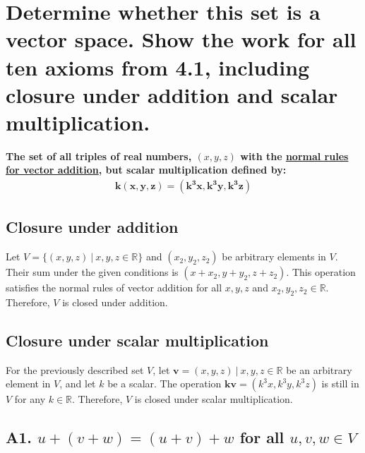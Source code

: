 \documentclass[
  letterpaper,
  DIV=11,
  numbers=noendperiod]{scrartcl}
\author{}
\date{}
\renewcommand*\contentsname{Table of contents}
\newcommand\contentsname{Table of contents}
\begin{document}

\newpage

\renewcommand*\contentsname{Table of Contents}
{
\hypersetup{linkcolor=}
\setcounter{tocdepth}{4}
\tableofcontents
}
\newpage{}

\section{Determine whether this set is a vector space. Show the work for
all ten axioms from 4.1, including closure under addition and scalar
multiplication.}\label{determine-whether-this-set-is-a-vector-space.-show-the-work-for-all-ten-axioms-from-4.1-including-closure-under-addition-and-scalar-multiplication.}

\textbf{The set of all triples of real numbers, \((x, y, z)\) with the
\ul{normal rules for vector addition}, but scalar multiplication defined
by:} \begin{align*}
\mathbf{k(x, y, z) = (k^3x, k^3y, k^3z)}
\end{align*}

\subsection{Closure under addition}\label{closure-under-addition}

Let \(V = \{(x, y, z) \ \vert \ x, y, z \in \mathbb{R}\}\) and
\((x_2, y_2, z_2)\) be arbitrary elements in \(V\). Their sum under the
given conditions is \((x+x_2, y+y_2, z+z_2)\). This operation satisfies
the normal rules of vector addition for all \(x, y, z\) and
\(x_2, y_2, z_2 \in \mathbb{R}.\) Therefore, \(V\) is closed under
addition.

\subsection{Closure under scalar
multiplication}\label{closure-under-scalar-multiplication}

For the previously described set \(V\), let
\(\mathbf{v} = (x,y,z) \ \vert \ x, y, z \in \mathbb{R}\) be an
arbitrary element in \(V\), and let \(k\) be a scalar. The operation
\(\mathbf{kv} = (k^3x,k^3y,k^3z)\) is still in \(V\) for any
\(k \in \mathbb{R}\). Therefore, \(V\) is closed under scalar
multiplication.

\subsection{\texorpdfstring{A1. \(u+(v+w)=(u+v)+w\) for all
\(u,v,w \in V\)}{A1. u+(v+w)=(u+v)+w for all u,v,w \textbackslash in V}}\label{a1.-uvwuvw-for-all-uvw-in-v}
\end{document}
